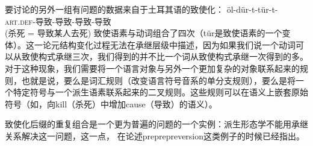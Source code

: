 要讨论的另外一组有问题的数据来自于土耳其语的致使化\citep[]{Lewis67a-u}：
\ea
\gll öl-dür-t-tür-t- \\
\textsc{art}.\textsc{def}-导致-导致-导致-导致\\
(杀死 = 导致某人去死)
\z
致使语素与动词组合了四次（tür是致使语素的一个变体）。这一论元结构变化过程无法在承继层级中描述，因为如果我们说一个动词可以从致使构式承继三次，我们得到的并不比一个词从致使构式承继一次得到的多。对于这种现象，我们需要将一个语言对象与另外一个更加复杂的对象联系起来的规则，也就是说，要么是词汇规则（改变语言符号音系的单分支规则），要么是将一个特定符号与一个派生语素联系起来的二叉规则。这些规则可以在语义上嵌套原始符号（如，向kill（杀死）中增加cause（导致）的语义）。

致使化后缀的重复组合是一个更为普遍的问题的一个实例：派生形态学不能用承继关系解决这一问题，这一点， \citet{KN93a}在论述preprepreversion这类例子的时候已经指出。

